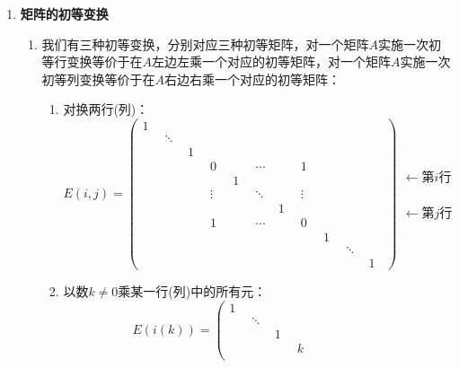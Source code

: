 \documentclass[12pt,a4paper,UTF8]{book}
\begin{document}
\begin{enumerate}
\begin{enumerate}
\begin{enumerate}
\end{enumerate}
\end{enumerate}
\item \textbf{矩阵的初等变换}
\begin{enumerate}
\item 我们有三种初等变换，分别对应三种初等矩阵，对一个矩阵$A$实施一次初等行变换等价于在$A$左边左乘一个对应的初等矩阵，对一个矩阵$A$实施一次初等列变换等价于在$A$右边右乘一个对应的初等矩阵：
\begin{enumerate}
\item 对换两行(列)：
\[E\left(i,j\right)=\left(\begin{array}{ccccccccccc}1&\quad&\quad&\quad&\quad&\quad&\quad&\quad&\quad&\quad&\quad\\\quad&\ddots&\quad&\quad&\quad&\quad&\quad&\quad&\quad&\quad&\quad\\\quad&\quad&1&\quad&\quad&\quad&\quad&\quad&\quad&\quad&\quad\\\quad&\quad&\quad&0&\quad&\cdots&\quad&1&\quad&\quad&\quad\\
\quad&\quad&\quad&\quad&1&\quad&\quad&\quad&\quad&\quad&\quad\\
\quad&\quad&\quad&\vdots&\quad&\ddots&\quad&\vdots&\quad&\quad&\quad\\
\quad&\quad&\quad&\quad&\quad&\quad&1&\quad&\quad&\quad&\quad\\
\quad&\quad&\quad&1&\quad&\cdots&\quad&0&\quad&\quad&\quad\\
\quad&\quad&\quad&\quad&\quad&\quad&\quad&\quad&1&\quad&\quad\\
\quad&\quad&\quad&\quad&\quad&\quad&\quad&\quad&\quad&\ddots&\quad\\
\quad&\quad&\quad&\quad&\quad&\quad&\quad&\quad&\quad&\quad&1\end{array}\right)\begin{array}{c}\quad\\\quad\\\quad\\\leftarrow\text{第}i\text{行}\\\quad\\\quad\\\quad\\\leftarrow\text{第}j\text{行}\\\quad\\\quad\\\quad\end{array}\]
\item 以数$k\neq0$乘某一行(列)中的所有元：
\[E\left(i\left(k\right)\right)=\left(\begin{array}{ccccccc}1&\quad&\quad&\quad&\quad&\quad&\quad\\\quad&\ddots&\quad&\quad&\quad&\quad&\quad\\\quad&\quad&1&\quad&\quad&\quad&\quad\\\quad&\quad&\quad&k&\quad&\quad&\quad\\

\end{array}\]
\end{enumerate}
\end{enumerate}
\end{enumerate}
\end{document}
